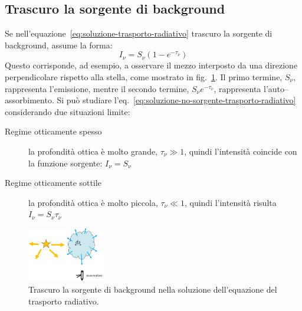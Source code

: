 \subsection{Trascuro la sorgente di background}\label{sec:trascuro-sorgente-trasporto-radiativo}
Se nell'equazione~\eqref{eq:soluzione-trasporto-radiativo} trascuro la sorgente di background, assume la forma:
\begin{equation}\label{eq:soluzione-no-sorgente-trasporto-radiativo}
    I_\nu = S_\nu (1- e^{-\tau_\nu})
\end{equation}
Questo corrisponde, ad esempio, a osservare il mezzo interposto da una direzione perpendicolare rispetto alla stella, come mostrato in fig.~\ref{fig:trasporto-radiativo-perpendicolare}. Il primo termine, $S_\nu$, rappresenta l'emissione, mentre il secondo termine, $S_\nu e^{-\tau_\nu}$, rappresenta l'auto--assorbimento. Si può studiare l'eq.~\eqref{eq:soluzione-no-sorgente-trasporto-radiativo} considerando due situazioni limite:
\begin{description}
    \item[Regime otticamente spesso] la profondità ottica è molto grande, $\tau_\nu \gg 1$, quindi l'intensità coincide con la funzione sorgente: $I_\nu = S_\nu$
    \item[Regime otticamente sottile] la profondità ottica è molto piccola, $\tau_\nu \ll 1$, quindi l'intensità risulta $I_\nu = S_\nu \tau_\nu$
\end{description}

\begin{figure}
\centering
\includegraphics[width=0.3\textwidth]{immagini/trasporto-radiativo-perpendicolare.png}
\caption{Trascuro la sorgente di background nella soluzione dell'equazione del trasporto radiativo.}
\label{fig:trasporto-radiativo-perpendicolare}
\end{figure}

